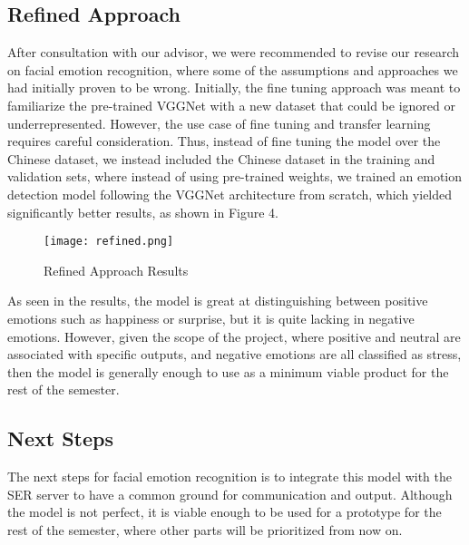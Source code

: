 \subsection{Refined Approach}
After consultation with our advisor, we were recommended to revise our research on facial emotion recognition, where some of the assumptions and approaches we had initially proven to be wrong. Initially, the fine tuning approach was meant to familiarize the pre-trained VGGNet with a new dataset that could be ignored or underrepresented. However, the use case of fine tuning and transfer learning requires careful consideration. Thus, instead of fine tuning the model over the Chinese dataset, we instead included the Chinese dataset in the training and validation sets, where instead of using pre-trained weights, we trained an emotion detection model following the VGGNet architecture from scratch, which yielded significantly better results, as shown in Figure 4.

\begin{figure}[ht]
    \centering
    \captionsetup{justification=centering}
    \texttt{[image: refined.png]}
    \caption{Refined Approach Results}
    \label{fig:refined}
\end{figure}

As seen in the results, the model is great at distinguishing between positive emotions such as happiness or surprise, but it is quite lacking in negative emotions. However, given the scope of the project, where positive and neutral are associated with specific outputs, and negative emotions are all classified as stress, then the model is generally enough to use as a minimum viable product for the rest of the semester.

\subsection{Next Steps}
The next steps for facial emotion recognition is to integrate this model with the SER server to have a common ground for communication and output. Although the model is not perfect, it is viable enough to be used for a prototype for the rest of the semester, where other parts will be prioritized from now on.
